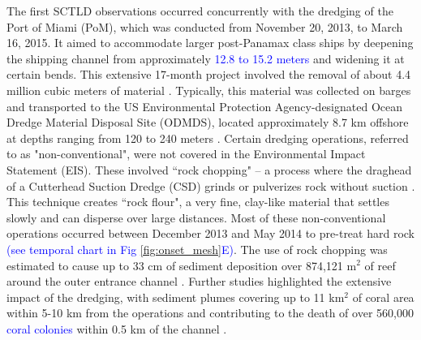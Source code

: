 \documentclass[preprint,12pt,authoryear]{elsarticle}
\newcommand{\modif}[1]{\textcolor{blue}{#1}}
\begin{document}
The first SCTLD observations occurred concurrently with the dredging of the Port of Miami (PoM), which was conducted from November 20, 2013, to March 16, 2015. It aimed to accommodate larger post-Panamax class ships by deepening the shipping channel from approximately \modif{12.8 to 15.2 meters} and widening it at certain bends. This extensive 17-month project involved the removal of about 4.4 million cubic meters of material \modif{\citep{noaa2023sedimentation}}. Typically, this material was collected on barges and transported to the US Environmental Protection Agency-designated Ocean Dredge Material Disposal Site (ODMDS), located approximately 8.7 km offshore at depths ranging from 120 to 240 meters \citep{noaa2023sedimentation}. Certain dredging operations, referred to as "non-conventional", were not covered in the Environmental Impact Statement (EIS). These involved ``rock chopping" -- a process where the draghead of a Cutterhead Suction Dredge (CSD) grinds or pulverizes rock without suction \modif{\citep{USACE2023_appendix}}. This technique creates ``rock flour", a very fine, clay-like material that settles slowly and can disperse over large distances. Most of these non-conventional operations occurred between December 2013 and May 2014 to pre-treat hard rock \modif{(see temporal chart in Fig \ref{fig:onset_mesh}E)}. The use of rock chopping was estimated to cause up to 33 cm of sediment deposition over 874,121 m$^2$ of reef around the outer entrance channel \citep{USACE2023_appendix}. Further studies highlighted the extensive impact of the dredging, with sediment plumes covering up to 11 km$^2$ of coral area within 5-10 km from the operations \citep{barnes2015sediment} and contributing to the death of over 560,000 \modif{coral colonies}  within 0.5 km of the channel \citep{cunning2019extensive}.
\end{document}
